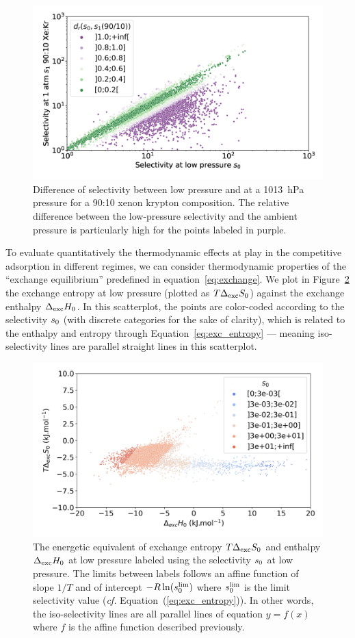 \documentclass[main.tex]{subfiles}
\begin{document}
\begin{figure}[t]
  \centering
    \includegraphics[width=0.6\linewidth]{figures/2-thermo/s_0_vs_s_9010_overview_log.jpg}
    \caption{Difference of selectivity between low pressure and at a \SI{1013}{\hecto\pascal} pressure for a 90:10 xenon krypton composition. The relative difference between the low-pressure selectivity and the ambient pressure is particularly high for the points labeled in purple.}\label{fgr:overview_9010}
\end{figure}
  
To evaluate quantitatively the thermodynamic effects at play in the competitive adsorption in different regimes, we can consider thermodynamic properties of the ``exchange equilibrium'' predefined in equation~\ref{eq:exchange}. We plot in Figure~\ref{fgr:HSplot_0} the exchange entropy at low pressure (plotted as $T\Delta_{\text{exc}}S_{\text{0}}$) against the exchange enthalpy $\Delta_{\text{exc}}H_{\text{0}}$. In this scatterplot, the points are color-coded according to the selectivity $s_{\text{0}}$ (with discrete categories for the sake of clarity), which is related to the enthalpy and entropy through Equation~\ref{eq:exc_entropy} --- meaning iso-selectivity lines are parallel straight lines in this scatterplot.
  
\begin{figure}[t]
\centering
  \includegraphics[width=0.6\linewidth]{figures/2-thermo/enthalpy_entropy_0_s_0.jpg}
  \caption{The energetic equivalent of exchange entropy $T\Delta_{\text{exc}}S_{\text{0}}$ and enthalpy $\Delta_{\text{exc}}H_{\text{0}}$ at low pressure labeled using the selectivity $s_{\text{0}}$ at low pressure. The limits between labels follows an affine function of slope $1/T$ and of intercept $-R\ln(s_{\text{0}}^{\text{lim}})$ where $s_{\text{0}}^{\text{lim}}$ is the limit selectivity value (\emph{cf.} Equation~(\ref{eq:exc_entropy})). In other words, the iso-selectivity lines are all parallel lines of equation $y=f(x)$ where $f$ is the affine function described previously.}\label{fgr:HSplot_0}
\end{figure}
\end{document}
